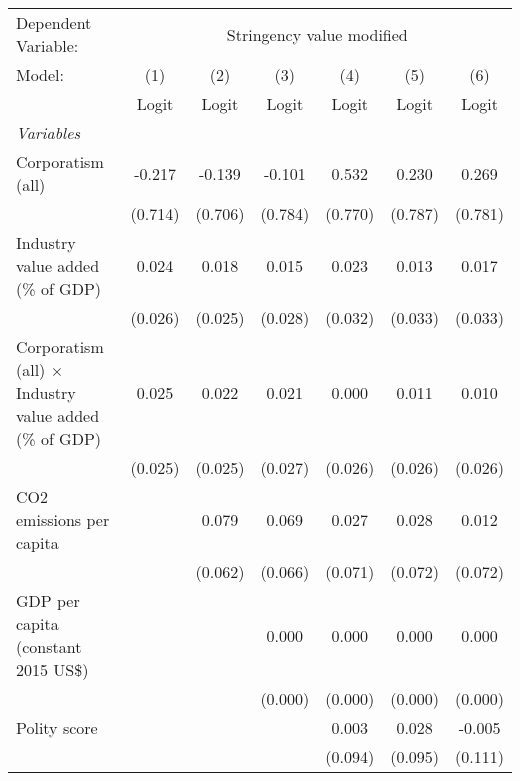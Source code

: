 
\begingroup
\centering
\begin{tabular}{lcccccc}
   \toprule
   Dependent Variable: & \multicolumn{6}{c}{Stringency value modified}\\
   Model:                                                        & (1)     & (2)     & (3)     & (4)     & (5)     & (6)\\  
                                                                 &  Logit  & Logit   & Logit   & Logit   & Logit   & Logit\\  
   \midrule
   \emph{Variables}\\
   Corporatism (all)                                             & -0.217  & -0.139  & -0.101  & 0.532   & 0.230   & 0.269\\   
                                                                 & (0.714) & (0.706) & (0.784) & (0.770) & (0.787) & (0.781)\\   
   Industry value added (\% of GDP)                              & 0.024   & 0.018   & 0.015   & 0.023   & 0.013   & 0.017\\   
                                                                 & (0.026) & (0.025) & (0.028) & (0.032) & (0.033) & (0.033)\\   
   Corporatism (all) $\times$ Industry value added (\% of GDP)   & 0.025   & 0.022   & 0.021   & 0.000   & 0.011   & 0.010\\   
                                                                 & (0.025) & (0.025) & (0.027) & (0.026) & (0.026) & (0.026)\\   
   CO2 emissions per capita                                      &         & 0.079   & 0.069   & 0.027   & 0.028   & 0.012\\   
                                                                 &         & (0.062) & (0.066) & (0.071) & (0.072) & (0.072)\\   
   GDP per capita (constant 2015 US\$)                           &         &         & 0.000   & 0.000   & 0.000   & 0.000\\   
                                                                 &         &         & (0.000) & (0.000) & (0.000) & (0.000)\\   
   Polity score                                                  &         &         &         & 0.003   & 0.028   & -0.005\\   
                                                                 &         &         &         & (0.094) & (0.095) & (0.111)\\   

\end{tabular}
